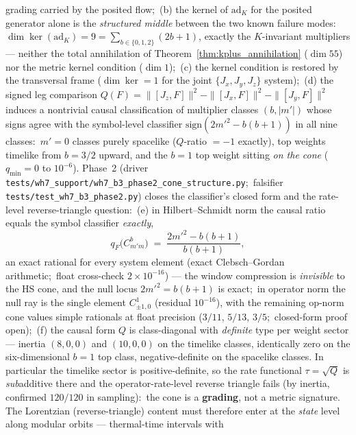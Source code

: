 \documentclass[11pt,a4paper]{article}
\theoremstyle{plain}
\theoremstyle{definition}
\begin{document}
\begin{enumerate}
grading carried by the posited flow;\
(b) the kernel of $\mathrm{ad}_K$ for the posited generator alone is the \emph{structured middle} between the
two known failure modes:\ $\dim \ker(\mathrm{ad}_{K}) = 9 =
\sum_{b \in \{0,1,2\}} (2b+1)$, exactly the $K$-invariant
multipliers — neither the total annihilation of
Theorem~\ref{thm:kplus_annihilation} ($\dim 55$) nor the metric kernel
condition ($\dim 1$);\
(c) the kernel condition is restored by the transversal frame
($\dim \ker = 1$ for the joint $\{J_{x}, J_{y}, J_{z}\}$ system);\
(d) the signed leg comparison $Q(F) = \|[J_{z},F]\|^{2} -
\|[J_{x},F]\|^{2} - \|[J_{y},F]\|^{2}$ induces a nontrivial causal
classification of multiplier classes $(b, |m'|)$ whose signs agree
with the symbol-level classifier $\mathrm{sign}(2m'^{2} - b(b+1))$ in
all nine classes:\ $m' = 0$ classes purely spacelike ($Q$-ratio $= -1$
exactly), top weights timelike from $b = 3/2$ upward, and the $b = 1$
top weight sitting \emph{on the cone} ($q_{\min} = 0$ to $10^{-6}$).
Phase~2 (driver
\texttt{tests/wh7\_support/wh7\_b3\_phase2\_cone\_structure.py};\ falsifier
\texttt{tests/test\_wh7\_b3\_phase2.py}) closes the classifier's
closed form and the rate-level reverse-triangle question:\
(e) in Hilbert--Schmidt norm the causal ratio equals the symbol
classifier \emph{exactly},
\begin{equation*}
  q_{F}\bigl(C^{b}_{m'm}\bigr) \;=\;
  \frac{2m'^{2} - b(b+1)}{b(b+1)},
\end{equation*}
an exact rational for every system element (exact Clebsch--Gordan
arithmetic;\ float cross-check $2{\times}10^{-16}$) — the window
compression is \emph{invisible} to the HS cone, and the null locus
$2m'^{2} = b(b+1)$ is exact;\ in operator norm the null ray is the
single element $C^{1}_{\pm 1, 0}$ (residual $10^{-16}$), with the
remaining op-norm cone values simple rationals at float precision
($3/11$, $5/13$, $3/5$;\ closed-form proof open);\
(f) the causal form $Q$ is class-diagonal with \emph{definite} type
per weight sector — inertia $(8,0,0)$ and $(10,0,0)$ on the timelike
classes, identically zero on the six-dimensional $b = 1$ top class,
negative-definite on the spacelike classes. In particular the
timelike sector is positive-definite, so the rate functional $\tau =
\sqrt{Q}$ is \emph{sub}additive there and the operator-rate-level
reverse triangle fails (by inertia, confirmed $120/120$ in
sampling):\ the cone is a \textbf{grading}, not a metric signature.
The Lorentzian (reverse-triangle) content must therefore enter at the
\emph{state} level along modular orbits — thermal-time intervals with

\end{enumerate}
\end{document}
